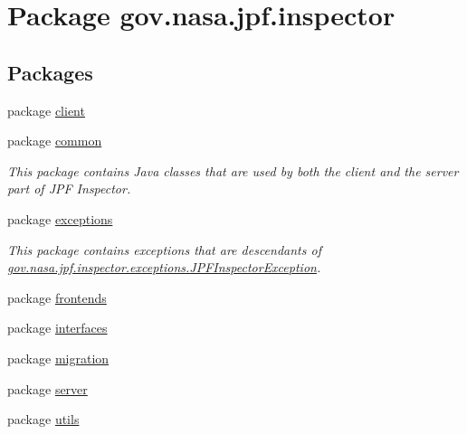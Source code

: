 \hypertarget{namespacegov_1_1nasa_1_1jpf_1_1inspector}{}\section{Package gov.\+nasa.\+jpf.\+inspector}
\label{namespacegov_1_1nasa_1_1jpf_1_1inspector}
\subsection*{Packages}
\begin{DoxyCompactItemize}
\item 
package \hyperlink{namespacegov_1_1nasa_1_1jpf_1_1inspector_1_1client}{client}
\item 
package \hyperlink{namespacegov_1_1nasa_1_1jpf_1_1inspector_1_1common}{common}
\begin{DoxyCompactList}\small\item\em This package contains Java classes that are used by both the client and the server part of J\+PF Inspector. \end{DoxyCompactList}\item 
package \hyperlink{namespacegov_1_1nasa_1_1jpf_1_1inspector_1_1exceptions}{exceptions}
\begin{DoxyCompactList}\small\item\em This package contains exceptions that are descendants of \hyperlink{classgov_1_1nasa_1_1jpf_1_1inspector_1_1exceptions_1_1_j_p_f_inspector_exception}{gov.\+nasa.\+jpf.\+inspector.\+exceptions.\+J\+P\+F\+Inspector\+Exception}. \end{DoxyCompactList}\item 
package \hyperlink{namespacegov_1_1nasa_1_1jpf_1_1inspector_1_1frontends}{frontends}
\item 
package \hyperlink{namespacegov_1_1nasa_1_1jpf_1_1inspector_1_1interfaces}{interfaces}
\item 
package \hyperlink{namespacegov_1_1nasa_1_1jpf_1_1inspector_1_1migration}{migration}
\item 
package \hyperlink{namespacegov_1_1nasa_1_1jpf_1_1inspector_1_1server}{server}
\item 
package \hyperlink{namespacegov_1_1nasa_1_1jpf_1_1inspector_1_1utils}{utils}

\end{DoxyCompactItemize}
